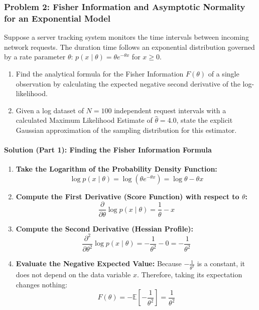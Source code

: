 \documentclass{article}
\begin{document}
\subsubsection{Problem 2: Fisher Information and Asymptotic Normality for an Exponential Model}
Suppose a server tracking system monitors the time intervals between incoming network requests. The duration time follows an exponential distribution governed by a rate parameter $\theta$: $p(x \mid \theta) = \theta e^{-\theta x}$ for $x \ge 0$. 

\begin{enumerate}
    \item Find the analytical formula for the Fisher Information $F(\theta)$ of a single observation by calculating the expected negative second derivative of the log-likelihood.
    \item Given a log dataset of $N=100$ independent request intervals with a calculated Maximum Likelihood Estimate of $\hat{\theta} = 4.0$, state the explicit Gaussian approximation of the sampling distribution for this estimator.
\end{enumerate}

\paragraph{Solution (Part 1): Finding the Fisher Information Formula}
\begin{enumerate}
    \item \textbf{Take the Logarithm of the Probability Density Function:}
    \begin{equation}
    \log p(x \mid \theta) = \log\left(\theta e^{-\theta x}\right) = \log \theta - \theta x
    \end{equation}
    
    \item \textbf{Compute the First Derivative (Score Function) with respect to $\theta$:}
    \begin{equation}
    \frac{\partial}{\partial \theta} \log p(x \mid \theta) = \frac{1}{\theta} - x
    \end{equation}
    
    \item \textbf{Compute the Second Derivative (Hessian Profile):}
    \begin{equation}
    \frac{\partial^2}{\partial \theta^2} \log p(x \mid \theta) = -\frac{1}{\theta^2} - 0 = -\frac{1}{\theta^2}
    \end{equation}
    
    \item \textbf{Evaluate the Negative Expected Value:}
    Because $-\frac{1}{\theta^2}$ is a constant, it does not depend on the data variable $x$. Therefore, taking its expectation changes nothing:
    \begin{equation}
    F(\theta) = -\mathbb{E}\left[ -\frac{1}{\theta^2} \right] = \frac{1}{\theta^2}
    \end{equation}
\end{enumerate}
\end{document}
